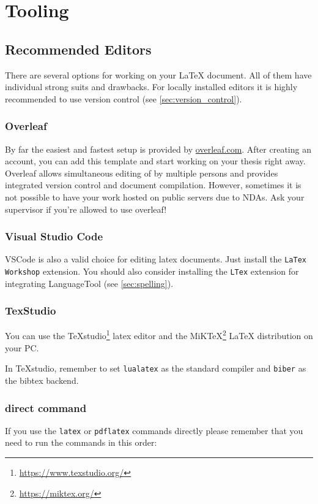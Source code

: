 \chapter{Tooling}

\section{Recommended Editors}
There are several options for working on your LaTeX document. All of them have individual strong suits and drawbacks. For locally installed editors it is highly recommended to use version control (see \autoref{sec:version_control}).

\subsection{Overleaf}
By far the easiest and fastest setup is provided by \url{overleaf.com}. After creating an account, you can add this template and start working on your thesis right away.
Overleaf allows simultaneous editing of by multiple persons and provides integrated version control and document compilation.
However, sometimes it is not possible to have your work hosted on public servers due to \acp{NDA}. Ask your supervisor if you're allowed to use overleaf!

\subsection{Visual Studio Code}
VSCode is also a valid choice for editing latex documents. Just install the \texttt{LaTex Workshop} extension. You should also consider installing the \texttt{LTex} extension for integrating LanguageTool (see \autoref{sec:spelling}).

\subsection{TexStudio}
You can use the TeXstudio\footnote{\url{https://www.texstudio.org/}} latex editor and the MiKTeX\footnote{\url{https://miktex.org/}} LaTeX distribution on your PC.

In TeXstudio, remember to set \texttt{lualatex} as the standard compiler and \texttt{biber} as the bibtex backend.

\subsection{direct command}
If you use the \texttt{latex} or \texttt{pdflatex} commands directly please remember that you need to run the commands in this order:

